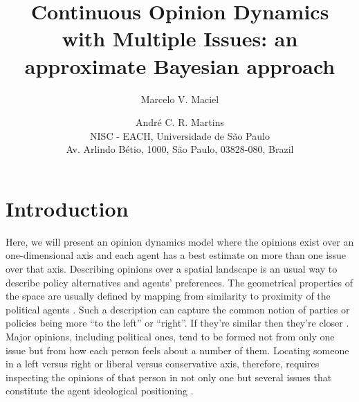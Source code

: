 \documentclass{article}
\begin{document}
\title{Continuous Opinion Dynamics with Multiple Issues: an approximate Bayesian
  approach}


\author{Marcelo V. Maciel \and Andr\'e C. R. Martins\\
	NISC - EACH, Universidade de S\~ao Paulo\\
	Av. Arlindo B\'etio, 1000, S\~ao Paulo, 03828-080, Brazil}

 

\date{}


\maketitle



\begin{abstract}
	
	
\end{abstract}


\section{Introduction}


Here, we will present an opinion dynamics model
\cite{castellanoetal07,galam12a,galametal82,galammoscovici91,sznajd00,deffuantetal00,martins08a}
where the opinions exist over an one-dimensional axis and each agent has a best
estimate on more than one issue over that axis. Describing opinions over a
spatial landscape is an usual way to describe policy alternatives and agents'
preferences. The geometrical properties of the space are usually defined by
mapping from similarity to proximity of the political agents
\cite{downs1957economic, laver2014measuring}. Such a description can capture the
common notion of parties or policies being more ``to the left'' or ``right''. If
they're similar then they're closer \cite{van2005political, miller2015spatial}.
Major opinions, including political ones, tend to be formed not from only one
issue but from how each person feels about a number of them. Locating someone in
a left versus right or liberal versus conservative axis, therefore, requires
inspecting the opinions of that person in not only one but several issues that constitute the agent ideological positioning \cite{benoit2006party}.
\end{document}

